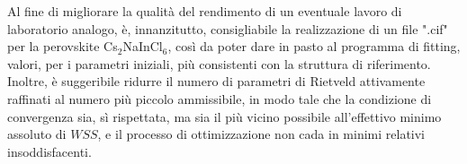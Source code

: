 \documentclass[a4paper,twocolumn,12 pt]{article}
\begin{document}
Al fine di migliorare la qualità del rendimento di un eventuale lavoro di laboratorio analogo, è, innanzitutto, consigliabile la realizzazione di un file ".cif" per la perovskite Cs$_2$NaInCl$_6$, così da poter dare in pasto al programma di fitting, valori, per i parametri iniziali, più consistenti con la struttura di riferimento. Inoltre, è suggeribile ridurre il numero di parametri di Rietveld attivamente raffinati al numero più piccolo ammissibile, in modo tale che la condizione di convergenza sia, sì rispettata, ma sia il più vicino possibile all'effettivo minimo assoluto di $WSS$, e il processo di ottimizzazione non cada in minimi relativi insoddisfacenti.


\onecolumn
\newpage
\printbibliography
\end{document}
